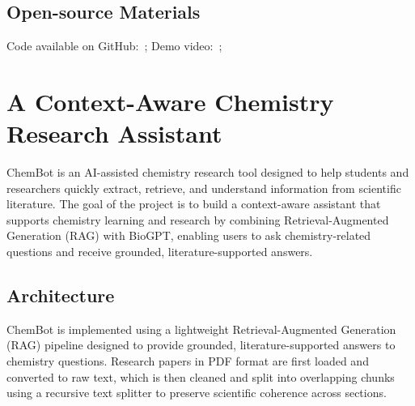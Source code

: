 \subsection*{Open-source Materials}
Code available on GitHub: \,; Demo video: \,;





\section{A Context-Aware Chemistry Research Assistant}

ChemBot is an AI-assisted chemistry research tool designed to help students and researchers quickly extract, retrieve, and understand information from scientific literature. The goal of the project is to build a context-aware assistant that supports chemistry learning and research by combining Retrieval-Augmented Generation (RAG) with BioGPT, enabling users to ask chemistry-related questions and receive grounded, literature-supported answers.

\subsection*{Architecture}
ChemBot is implemented using a lightweight Retrieval-Augmented Generation (RAG) pipeline designed to
provide grounded, literature-supported answers to chemistry questions. Research papers in PDF format are
first loaded and converted to raw text, which is then cleaned and split into overlapping chunks using a
recursive text splitter to preserve scientific coherence across sections.

